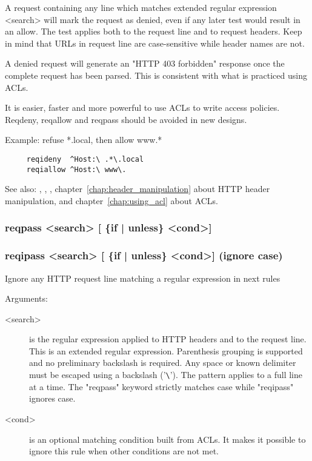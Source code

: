   A request containing any line which matches extended regular expression
  <search> will mark the request as denied, even if any later test would
  result in an allow. The test applies both to the request line and to request
  headers. Keep in mind that URLs in request line are case-sensitive while
  header names are not.

  A denied request will generate an "HTTP 403 forbidden" response once the
  complete request has been parsed. This is consistent with what is practiced
  using ACLs.

  It is easier, faster and more powerful to use ACLs to write access policies.
  Reqdeny, reqallow and reqpass should be avoided in new designs.

  Example: refuse *.local, then allow www.*
  
\begin{verbatim}
     reqideny  ^Host:\ .*\.local
     reqiallow ^Host:\ www\.
\end{verbatim}


See also: , , , chapter~\ref{chap:header_manipulation} about HTTP header
            manipulation, and chapter~\ref{chap:using_acl} about ACLs.

\subsubsection[reqpass]{reqpass  <search> [ \{if | unless\} <cond>] }
\subsubsection[reqipass]{reqipass <search> [ \{if | unless\} <cond>]  (ignore case) }


  Ignore any HTTP request line matching a regular expression in next rules


  Arguments:
  \begin{description}
  \item[<search>] is the regular expression applied to HTTP headers and to the
              request line. This is an extended regular expression. Parenthesis
              grouping is supported and no preliminary backslash is required.
              Any space or known delimiter must be escaped using a backslash
              ('\verb|\|'). The pattern applies to a full line at a time. The
              "reqpass" keyword strictly matches case while "reqipass" ignores
              case.

  \item[<cond>] is an optional matching condition built from ACLs. It makes it
              possible to ignore this rule when other conditions are not met.
  \end{description}

